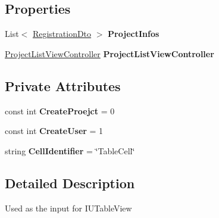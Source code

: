\subsection*{Properties}
\begin{DoxyCompactItemize}
\item 
\mbox{\label{class_ramboell_1_1i_o_s_1_1_table_source_ae0fe7793c01c2b4f396d7dab4b6e37f5}} 
List$<$ \hyperlink{class_ramboell_1_1i_o_s_1_1_registration_dto}{Registration\+Dto} $>$ {\bfseries Project\+Infos}
\item 
\mbox{\label{class_ramboell_1_1i_o_s_1_1_table_source_afa2c9dfc0246691be13b51d1ae005395}} 
\hyperlink{class_ramboell_1_1i_o_s_1_1_project_list_view_controller}{Project\+List\+View\+Controller} {\bfseries Project\+List\+View\+Controller}
\end{DoxyCompactItemize}
\subsection*{Private Attributes}
\begin{DoxyCompactItemize}
\item 
\mbox{\label{class_ramboell_1_1i_o_s_1_1_table_source_abef74a5e22f05b9d396fdf75a04157ea}} 
const int {\bfseries Create\+Proejct} = 0
\item 
\mbox{\label{class_ramboell_1_1i_o_s_1_1_table_source_a337b1fdd687a20321bc53492f682f20e}} 
const int {\bfseries Create\+User} = 1
\item 
\mbox{\label{class_ramboell_1_1i_o_s_1_1_table_source_a48b6eb2c6e8feff06a5980b2bfb187d9}} 
string {\bfseries Cell\+Identifier} = \char`\"{}Table\+Cell\char`\"{}
\end{DoxyCompactItemize}


\subsection{Detailed Description}
Used as the input for I\+U\+Table\+View 



